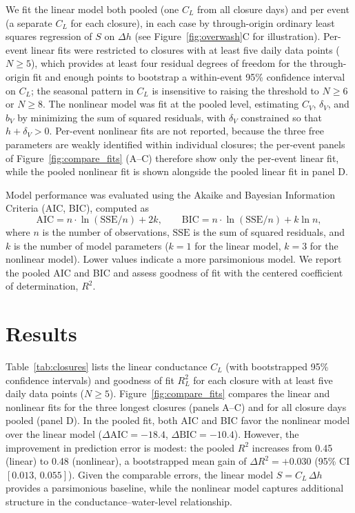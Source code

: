 \documentclass[preprint,12pt,authoryear]{elsarticle}
\begin{document}
We fit the linear model both pooled (one $C_L$ from all closure days) and per event (a separate $C_L$ for each closure), in each case by through-origin ordinary least squares regression of $S$ on $\Delta h$ (see Figure~\ref{fig:overwash}C for illustration). Per-event linear fits were restricted to closures with at least five daily data points ($N \ge 5$), which provides at least four residual degrees of freedom for the through-origin fit and enough points to bootstrap a within-event 95\% confidence interval on $C_L$; the seasonal pattern in $C_L$ is insensitive to raising the threshold to $N \ge 6$ or $N \ge 8$.
The nonlinear model was fit at the pooled level, estimating $C_V$, $\delta_V$, and $b_V$ by minimizing the sum of squared residuals, with $\delta_V$ constrained so that $h + \delta_V > 0$. Per-event nonlinear fits are not reported, because the three free parameters are weakly identified within individual closures; the per-event panels of Figure~\ref{fig:compare_fits} (A--C) therefore show only the per-event linear fit, while the pooled nonlinear fit is shown alongside the pooled linear fit in panel D.

Model performance was evaluated using the Akaike and Bayesian Information Criteria (AIC, BIC), computed as
\begin{equation}
    \mathrm{AIC} = n \cdot \ln(\mathrm{SSE}/n) + 2k,
    \qquad
    \mathrm{BIC} = n \cdot \ln(\mathrm{SSE}/n) + k \ln n,
\end{equation}
where $n$ is the number of observations, $\mathrm{SSE}$ is the sum of squared residuals, and $k$ is the number of model parameters ($k = 1$ for the linear model, $k = 3$ for the nonlinear model). Lower values indicate a more parsimonious model. We report the pooled AIC and BIC and assess goodness of fit with the centered coefficient of determination, $R^2$.


\section{Results}

Table~\ref{tab:closures} lists the linear conductance $C_L$ (with bootstrapped 95\% confidence intervals) and goodness of fit $R^2_L$ for each closure with at least five daily data points ($N \ge 5$). Figure~\ref{fig:compare_fits} compares the linear and nonlinear fits for the three longest closures (panels A--C) and for all closure days pooled (panel D).
In the pooled fit, both AIC and BIC favor the nonlinear model over the linear model ($\Delta\mathrm{AIC} = -18.4$, $\Delta\mathrm{BIC} = -10.4$).
However, the improvement in prediction error is modest: the pooled $R^2$ increases from 0.45 (linear) to 0.48 (nonlinear), a bootstrapped mean gain of $\Delta R^2 = +0.030$ (95\% CI $[0.013,\,0.055]$).
Given the comparable errors, the linear model $S = C_L\,\Delta h$ provides a parsimonious baseline, while the nonlinear model captures additional structure in the conductance--water-level relationship.
\end{document}
